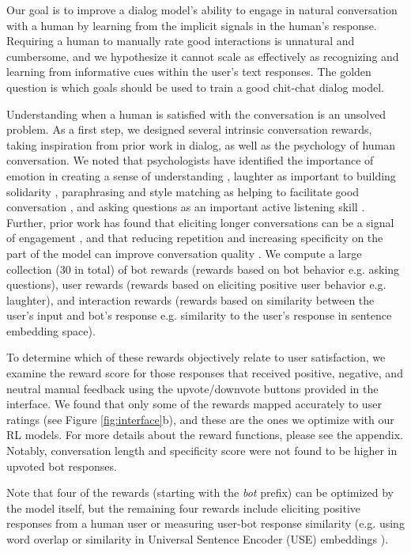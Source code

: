 Our goal is to improve a dialog model's ability to engage in natural conversation with a human by learning from the implicit signals in the human's response. Requiring a human to manually rate good interactions is unnatural and cumbersome, and we hypothesize it cannot scale as effectively as recognizing and learning from informative cues within the user's text responses. The golden question is which goals should be used to train a good chit-chat dialog model.

Understanding when a human is satisfied with the conversation is an unsolved problem. As a first step, we designed several intrinsic conversation rewards, taking inspiration from prior work in dialog, as well as the psychology of human conversation. We noted that psychologists have identified the importance of emotion in creating a sense of understanding \cite{bodie2015role, weger2010active}, laughter as important to building solidarity \cite{hay2000functions}, paraphrasing and style matching as helping to facilitate good conversation \cite{ireland2011language, weger2010active}, and asking questions as an important active listening skill \cite{bodie2012listening}. Further, prior work has found that eliciting longer conversations can be a signal of engagement \cite{sidner2004look,zhou2018design}, and that reducing repetition and increasing specificity on the part of the model can improve conversation quality \cite{see2019makes, mehri2020unsupervised}. We compute a large collection (30 in total) of bot rewards (rewards based on bot behavior e.g. asking questions), user rewards (rewards based on eliciting positive user behavior e.g. laughter), and interaction rewards (rewards based on similarity between the user's input and bot's response e.g. similarity to the user's response in sentence embedding space). 

To determine which of these rewards objectively relate to user satisfaction, we examine the reward score for those responses that received positive, negative, and neutral manual feedback using the upvote/downvote buttons provided in the interface. We found that only some of the rewards mapped accurately to user ratings (see Figure \ref{fig:interface}b), and these are the ones we optimize with our RL models. For more details about the reward functions, please see the appendix. Notably, conversation length and specificity score were not found to be higher in upvoted bot responses. 

Note that four of the rewards (starting with the \textit{bot} prefix) can be optimized by the model itself, but the remaining four rewards include eliciting positive responses from a human user or measuring user-bot response similarity (e.g. using word overlap or similarity in Universal Sentence Encoder (USE) embeddings \cite{cer2018universal}). 

